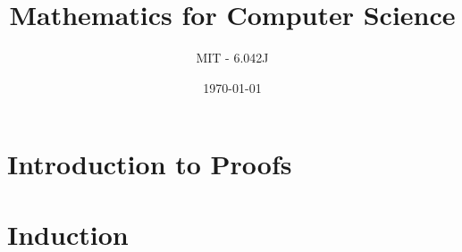 \documentclass[12pt]{article}
\title{\textbf{Mathematics for Computer Science}}
\author{MIT - 6.042J}
\date{\today}
\begin{document}
\maketitle
\tableofcontents
\newpage

\section{Introduction to Proofs}


\section{Induction}

\end{document}
